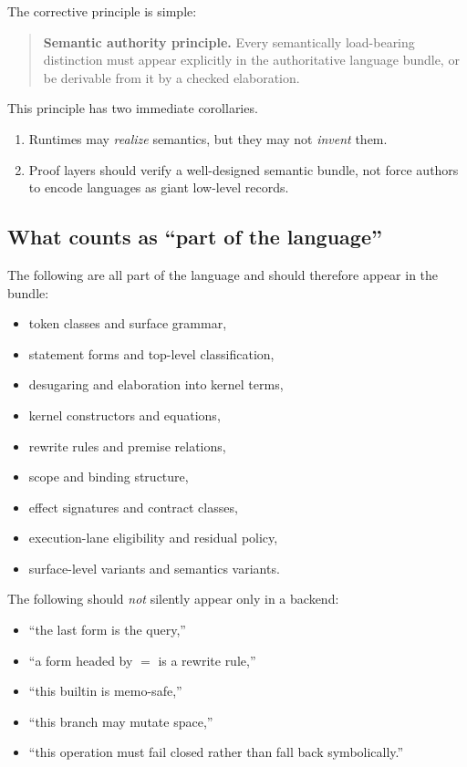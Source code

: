 \documentclass[11pt]{article}
\begin{document}
The corrective principle is simple:
\begin{quote}
\textbf{Semantic authority principle.} Every semantically load-bearing distinction must appear explicitly in the authoritative language bundle, or be derivable from it by a checked elaboration.
\end{quote}

This principle has two immediate corollaries.
\begin{enumerate}[leftmargin=2em]
  \item Runtimes may \emph{realize} semantics, but they may not \emph{invent} them.
  \item Proof layers should verify a well-designed semantic bundle, not force authors to encode languages as giant low-level records.
\end{enumerate}

\subsection{What counts as ``part of the language''}

The following are all part of the language and should therefore appear in the bundle:
\begin{itemize}[leftmargin=2em]
  \item token classes and surface grammar,
  \item statement forms and top-level classification,
  \item desugaring and elaboration into kernel terms,
  \item kernel constructors and equations,
  \item rewrite rules and premise relations,
  \item scope and binding structure,
  \item effect signatures and contract classes,
  \item execution-lane eligibility and residual policy,
  \item surface-level variants and semantics variants.
\end{itemize}

The following should \emph{not} silently appear only in a backend:
\begin{itemize}[leftmargin=2em]
  \item ``the last form is the query,''
  \item ``a form headed by $=$ is a rewrite rule,''
  \item ``this builtin is memo-safe,''
  \item ``this branch may mutate space,''
  \item ``this operation must fail closed rather than fall back symbolically.''
\end{itemize}
\end{document}
